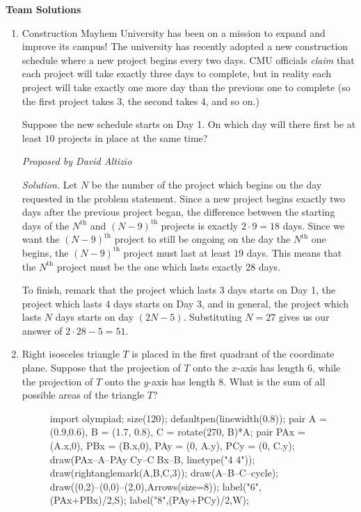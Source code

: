 \documentclass[10pt]{article}
\newcommand{\proposed}[1]
{
\vspace{5pt}
\noindent\textit{Proposed by #1}
}
\newcommand{\solution}
{
\vspace{5pt}
\noindent\textit{Solution.}\qquad
}
\begin{document}
\begin{center}
\huge\textbf{Team Solutions}\normalsize

\vspace{3pt}
\end{center}

\begin{enumerate}

\item Construction Mayhem University has been on a mission to expand and improve its campus!  The university has recently adopted a new construction schedule where a new project begins every two days.  CMU officials \textit{claim} that each project will take exactly three days to complete, but in reality each project will take exactly one more day than the previous one to complete (so the first project takes 3, the second takes 4, and so on.)

\par Suppose the new schedule starts on Day 1.  On which day will there first be at least $10$ projects in place at the same time?

\proposed{David Altizio}

\solution Let $N$ be the number of the project which begins on the day requested
in the problem statement. Since a new project begins exactly two days after the
previous project began, the difference between the starting days of the
$N^{\text{th}}$ and $(N-9)^{\text{th}}$ projects is exactly $2\cdot 9  = 18$
days.  Since we want the $(N-9)^{\text{th}}$ project to still be ongoing on the
day the $N^{\text{th}}$ one begins, the $(N-9)^{\text{th}}$ project must last at
least $19$ days.  This means that the $N^{\text{th}}$ project must be the one
which lasts exactly $28$ days.

\par To finish, remark that the project which lasts $3$ days starts on Day 1,
the project which lasts $4$ days starts on Day 3, and in general, the project
which lasts $N$ days starts on day $(2N-5)$.  Substituting $N=27$ gives us our
answer of $2\cdot 28 - 5 = \boxed{51}$.  

\item Right isosceles triangle $T$ is placed in the first quadrant of the coordinate plane.  Suppose that the projection of $T$ onto the $x$-axis has length $6$, while the projection of $T$ onto the $y$-axis has length $8$.  What is the sum of all possible areas of the triangle $T$?

\begin{figure}[ht]
	\centering
	\begin{asy}
	import olympiad;
	size(120);
	defaultpen(linewidth(0.8));
	pair A = (0.9,0.6), B = (1.7, 0.8), C = rotate(270, B)*A;
	pair PAx = (A.x,0), PBx = (B.x,0), PAy = (0, A.y), PCy = (0, C.y);
	draw(PAx--A--PAy^^PCy--C^^PBx--B, linetype("4 4"));
	draw(rightanglemark(A,B,C,3));
	draw(A--B--C--cycle);
	draw((0,2)--(0,0)--(2,0),Arrows(size=8));
	label("$6$",(PAx+PBx)/2,S);
	label("$8$",(PAy+PCy)/2,W);
\end{asy}
\end{figure}


\end{enumerate}
\end{document}
